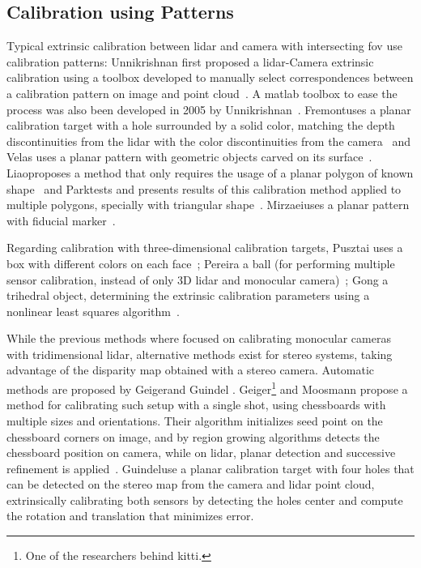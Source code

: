 \subsection{Calibration using Patterns}
Typical extrinsic calibration between \ac{lidar} and camera with intersecting \ac{fov} use calibration patterns: Unnikrishnan first proposed a \ac{lidar}-Camera extrinsic calibration using a toolbox developed to manually select correspondences between a calibration pattern on image and point cloud~\cite{Unnikrishnan2005}. A \ac{matlab} toolbox to ease the process was also been developed in 2005 by Unnikrishnan\etal~\cite{Unnikrishnan}. Fremont\etal uses a planar calibration target with a hole surrounded by a solid color, matching the depth discontinuities from the \ac{lidar} with the color discontinuities from the camera~\cite{Fremont2013} and Velas uses a planar pattern with geometric objects carved on its surface~\cite{MartinVelas2013}. Liao\etal proposes a method that only requires the usage of a planar polygon of known shape~\cite{Liao2019} and Park\etal tests and presents results of this calibration method applied to multiple polygons, specially with triangular shape~\cite{Park2014}. Mirzaei\etal uses a planar pattern with fiducial marker~\cite{Mirzaei2012}. 

Regarding calibration with three-dimensional calibration targets, Pusztai uses a box with different colors on each face~\cite{Pusztai2018}; Pereira a ball (for performing multiple sensor calibration, instead of only 3D \ac{lidar} and monocular camera)~\cite{Pereira2016}; Gong a trihedral object, determining the extrinsic calibration parameters using a nonlinear least squares algorithm~\cite{Gong2013}.

While the previous methods where focused on calibrating monocular cameras with tridimensional \ac{lidar}, alternative methods exist for stereo systems, taking advantage of the disparity map obtained with a stereo camera. Automatic methods are proposed by Geiger\etal and Guindel \etal. Geiger\footnote{One of the researchers behind \ac{kitti}.} and Moosmann propose a method for calibrating such setup with a single shot, using chessboards with multiple sizes and orientations. Their algorithm initializes seed point on the chessboard corners on image, and by region growing algorithms detects the chessboard position on camera, while on \ac{lidar}, planar detection and successive refinement is applied~\cite{Geiger2012a}. Guindel\etal use a planar calibration target with four holes that can be detected on the stereo map from the camera and \ac{lidar} point cloud, extrinsically calibrating both sensors by detecting the holes center and compute the rotation and translation that minimizes error. 

